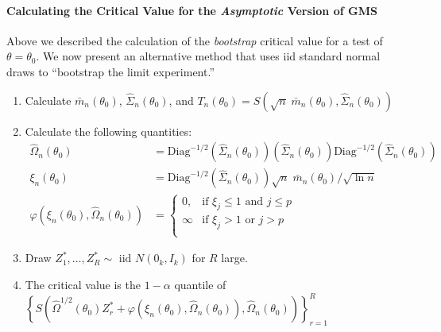 \documentclass[12pt]{article}
\begin{document}
\paragraph{Calculating the Critical Value for the \emph{Asymptotic} Version of GMS}
Above we described the calculation of the \emph{bootstrap} critical value for a test of $\theta = \theta_0$. 
We now present an alternative method that uses iid standard normal draws to ``bootstrap the limit experiment.''

\begin{enumerate}
  \item Calculate $\bar{m}_n(\theta_0)$, $\widehat{\Sigma}_n(\theta_0)$, and $T_n(\theta_0) = S\left( \sqrt{n}\; \bar{m}_n(\theta_0), \widehat{\Sigma}_n(\theta_0) \right)$
  \item Calculate the following quantities:
    \begin{align*}
      \widehat{\Omega}_n(\theta_0) &= \mbox{Diag}^{-1/2}\left(\widehat{\Sigma}_n(\theta_0)  \right)\left(\widehat{\Sigma}_n(\theta_0)\right)\mbox{Diag}^{-1/2}\left( \widehat{\Sigma}_n(\theta_0) \right)\\
      \xi_n(\theta_0) &= \mbox{Diag}^{-1/2}\left( \widehat{\Sigma}_n(\theta_0) \right) \sqrt{n}\; \bar{m}_n(\theta_0) / \sqrt{\ln n}\\
      \varphi\left( \xi_n(\theta_0), \widehat{\Omega}_n(\theta_0) \right) &= \left\{
      \begin{array}{cc}
        0, & \mbox{if } \xi_j \leq 1 \mbox{ and } j \leq p \\
        \infty & \mbox{if } \xi_j > 1 \mbox{ or } j > p\\
      \end{array}
      \right.
    \end{align*}
  \item Draw $Z_1^*, \hdots, Z_R^* \sim \mbox{ iid } N(0_k, I_k)$ for $R$ large.
  \item The critical value is the $1 - \alpha$ quantile of $\left\{S\left( \widehat{\Omega}^{1/2}(\theta_0) Z_r^* + \varphi\left( \xi_n(\theta_0), \widehat{\Omega}_n(\theta_0) \right), \widehat{\Omega}_n(\theta_0) \right)\right\}_{r=1}^R$
\end{enumerate}
\end{document}

